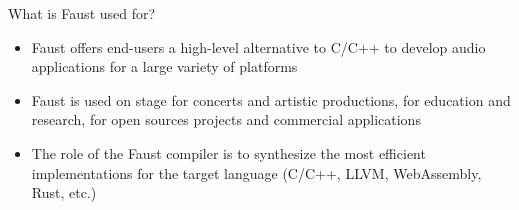 
\begin{frame}[fragile]{What is Faust used for?}
	\begin{itemize}
		
		\item Faust offers end-users a high-level alternative to C/C++ to develop audio applications for a large variety of platforms
		\item Faust is used on stage for concerts and artistic productions, for education and research, for open sources projects and commercial applications
		\item The role of the Faust compiler is to synthesize the most efficient implementations for the target language (C/C++, LLVM, WebAssembly, Rust, etc.)
	\end{itemize}
	
\end{frame}
